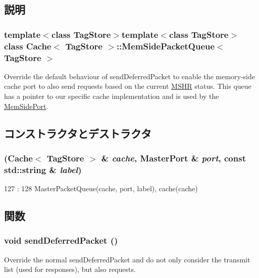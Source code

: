 \subsection{説明}
\subsubsection*{template$<$class TagStore$>$template$<$class TagStore$>$ class Cache$<$ TagStore $>$::MemSidePacketQueue$<$ TagStore $>$}

Override the default behaviour of sendDeferredPacket to enable the memory-\/side cache port to also send requests based on the current \hyperlink{classMSHR}{MSHR} status. This queue has a pointer to our specific cache implementation and is used by the \hyperlink{classCache_1_1MemSidePort}{MemSidePort}. 

\subsection{コンストラクタとデストラクタ}
\hypertarget{classCache_1_1MemSidePacketQueue_af98f7e700e64b2c5f5bd8f96b7368b0a}{
\subsubsection[{MemSidePacketQueue}]{ ({\bf Cache}$<$ TagStore $>$ \& {\em cache}, \/  {\bf MasterPort} \& {\em port}, \/  const std::string \& {\em label})}}
\label{classCache_1_1MemSidePacketQueue_af98f7e700e64b2c5f5bd8f96b7368b0a}



\begin{DoxyCode}
127                                                    :
128             MasterPacketQueue(cache, port, label), cache(cache) { }

\end{DoxyCode}


\subsection{関数}
\hypertarget{classCache_1_1MemSidePacketQueue_a3ce3f4b79c2caf000124b3de8ba9157c}{
\subsubsection[{sendDeferredPacket}]{\setlength{\rightskip}{0pt plus 5cm}void sendDeferredPacket ()}}
\label{classCache_1_1MemSidePacketQueue_a3ce3f4b79c2caf000124b3de8ba9157c}
Override the normal sendDeferredPacket and do not only consider the transmit list (used for responses), but also requests. 

